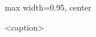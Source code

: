 
\begin{figure}[H]
\centering
\begin{adjustbox}{max width=0.95\textwidth, center}
\end{adjustbox}
\caption{<caption>}
\label{fig:<label>}
\end{figure}